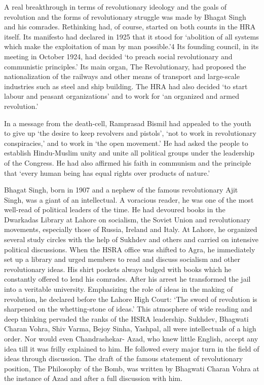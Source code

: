 A real breakthrough in terms of revolutionary ideology and the goals of revolution and the forms of revolutionary struggle was made by Bhagat Singh and his comrades. Rethinking had, of course, started on both counts in the HRA itself. Its manifesto had declared in 1925 that it stood for `abolition of all systems which make the exploitation of man by man possible.'4 Its founding council, in its meeting in October 1924, had decided `to preach social revolutionary and communistic principles.' Its main organ, The Revolutionary, had proposed the nationalization of the railways and other means of transport and large-scale industries such as steel and ship building. The HRA had also decided `to start labour and peasant organizations' and to work for `an organized and armed revolution.'

In a message from the death-cell, Ramprasad Bismil had appealed to the youth to give up `the desire to keep revolvers and pistols', `not to work in revolutionary conspiracies,' and to work in `the open movement.' He had asked the people to establish Hindu-Muslim unity and unite all political groups under the leadership of the Congress. He had also affirmed his faith in communism and the principle that `every human being has equal rights over products of nature.'

Bhagat Singh, born in 1907 and a nephew of the famous revolutionary Ajit Singh, was a giant of an intellectual. A voracious reader, he was one of the most well-read of political leaders of the time. He had devoured books in the Dwarkadas Library at Lahore on socialism, the Soviet Union and revolutionary movements, especially those of Russia, Ireland and Italy. At Lahore, he organized several study circles with the help of Sukhdev and others and carried on intensive political discussions. When the HSRA office was shifted to Agra, he immediately set up a library and urged members to read and discuss socialism and other revolutionary ideas. His shirt pockets always bulged with books which he constantly offered to lend his comrades. After his arrest he transformed the jail into a veritable university. Emphasizing the role of ideas in the making of revolution, he declared before the Lahore High Court: `The sword of revolution is sharpened on the whetting-stone of ideas.' This atmosphere of wide reading and deep thinking pervaded the ranks of the HSRA leadership. Sukhdev, Bhagwati Charan Vohra, Shiv Varma, Bejoy Sinha, Yashpal, all were intellectuals of a high order. Nor would even Chandrashekar- Azad, who knew little English, accept any idea till it was frilly explained to him. He followed every major turn in the field of ideas through discussion. The draft of the famous statement of revolutionary position, The Philosophy of the Bomb, was written by Bhagwati Charan Vohra at the instance of Azad and after a full discussion with him.

